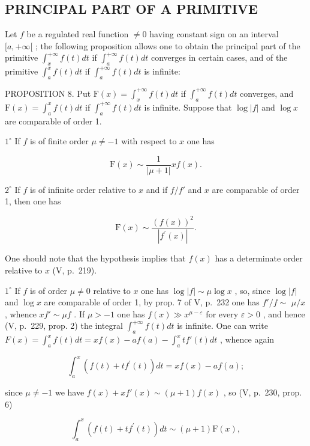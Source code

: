 \subsection{PRINCIPAL PART OF A PRIMITIVE}

Let \(f\) be a regulated real function \(\neq 0\) having constant sign on an interval \([a, +\infty[\) ; the following proposition allows one to obtain the principal part of the primitive \(\int_{x}^{+\infty} f(t) dt\) if \(\int_{a}^{+\infty} f(t) dt\) converges in certain cases, and of the primitive \(\int_{a}^{x} f(t) dt\) if \(\int_{a}^{+\infty} f(t) dt\) is infinite:

PROPOSITION 8. Put \(\mathrm{F}(x) = \int_{x}^{+\infty} f(t) dt\) if \(\int_{a}^{+\infty} f(t) dt\) converges, and \(\mathrm{F}(x) = \int_{a}^{x} f(t) dt\) if \(\int_{a}^{+\infty} f(t) dt\) is infinite. Suppose that \(\log |f|\) and \(\log x\) are comparable of order 1.

\(1^{\circ}\) If \(f\) is of finite order \(\mu \neq -1\) with respect to \(x\) one has

\[
\mathrm{F} (x) \sim \frac {1}{| \mu + 1 |} x f (x).\tag{1}
\]

\(2^{\circ}\) If \(f\) is of infinite order relative to \(x\) and if \(f / f'\) and \(x\) are comparable of order 1, then one has

\[
\mathrm{F} (x) \sim \frac {(f (x)) ^ {2}}{| f ^ {\prime} (x) |}.\tag{2}
\]

One should note that the hypothesis implies that \(f(x)\) has a determinate order relative to \(x\) (V, p.~219).

\(1^{\circ}\) If \(f\) is of order \(\mu \neq 0\) relative to \(x\) one has \(\log |f| \sim \mu \log x\) , so, since \(\log |f|\) and \(\log x\) are comparable of order 1, by prop. 7 of V, p.~232 one has \(f'/f \sim\) \(\mu/x\) , whence \(xf' \sim \mu f\) . If \(\mu > -1\) one has \(f(x) \gg x^{\mu-\varepsilon}\) for every \(\varepsilon > 0\) , and hence (V, p.~229, prop. 2) the integral \(\int_{a}^{+\infty} f(t) dt\) is infinite. One can write \(F(x) = \int_{a}^{x} f(t) dt = xf(x) - af(a) - \int_{a}^{x} tf'(t) dt\) , whence again

\[
\int_ {a} ^ {x} \left(f (t) + t f ^ {\prime} (t)\right) d t = x f (x) - a f (a);
\]

since \(\mu \neq -1\) we have \(f(x) + xf'(x) \sim (\mu + 1)f(x)\) , so (V, p.~230, prop. 6)

\[
\int_ {a} ^ {x} \left(f (t) + t f ^ {\prime} (t)\right) d t \sim (\mu + 1) \mathrm{F} (x),
\]

